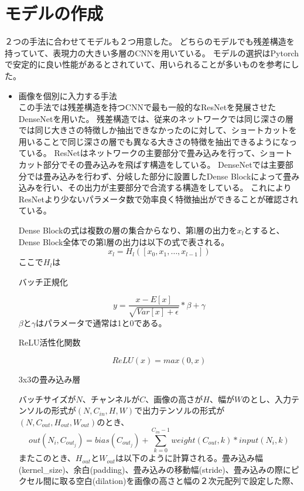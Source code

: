 \section{モデルの作成}
２つの手法に合わせてモデルも２つ用意した。
どちらのモデルでも残差構造を持っていて、表現力の大きい多層のCNNを用いている。
モデルの選択はPytorchで安定的に良い性能があるとされていて、用いられることが多いものを参考にした。
\begin{itemize}
    \item 画像を個別に入力する手法\\
この手法では残差構造を持つCNN\cite{CNN}で最も一般的なResNet\cite{ResNet}を発展させたDenseNet\cite{DenseNet}を用いた。
残差構造では、従来のネットワークでは同じ深さの層では同じ大きさの特徴しか抽出できなかったのに対して、ショートカットを用いることで同じ深さの層でも異なる大きさの特徴を抽出できるようになっている。
ResNet\cite{ResNet}はネットワークの主要部分で畳み込みを行って、ショートカット部分でその畳み込みを飛ばす構造をしている。
DenseNet\cite{DenseNet}では主要部分では畳み込みを行わず、分岐した部分に設置したDense Blockによって畳み込みを行い、その出力が主要部分で合流する構造をしている。
これによりResNet\cite{ResNet}より少ないパラメータ数で効率良く特徴抽出ができることが確認されている。

Dense Blockの式は複数の層の集合からなり、第l層の出力を$x_l$とすると、Dense Block全体での第l層の出力は以下の式で表される。
\begin{equation}
    x_l = H_l([x_0, x_1, … , x_{l-1}])
\end{equation}
ここで$H_l$は

バッチ正規化

\begin{equation}
     y = \frac{x - E[x]}{\sqrt{Var[x] + \epsilon}} * \beta + \gamma
\end{equation}
$\beta$と$\gamma$はパラメータで通常は1と0である。

ReLU活性化関数

\begin{equation}
     ReLU(x) = max(0, x)
\end{equation}

3x3の畳み込み層

バッチサイズが$N$、チャンネルが$C$、画像の高さが$H$、幅が$W$のとし、入力テンソルの形式が$(N, C_{in}, H, W)$で出力テンソルの形式が$(N, C_{out}, H_{out}, W_{out})$のとき、
\begin{equation}
    out(N_i, C_{out_j}) = bias(C_{out_j}) + \sum_{k=0}^{C_{in} - 1} weight(C_{out}, k) * input(N_i, k)
\end{equation}
またこのとき、$H_{out}$と$W_{out}$は以下のように計算される。畳み込み幅(kernel\_size)、余白(padding)、畳み込みの移動幅(stride)、畳み込みの際にピクセル間に取る空白(dilation)を画像の高さと幅の２次元配列で設定した際、


\end{itemize}
